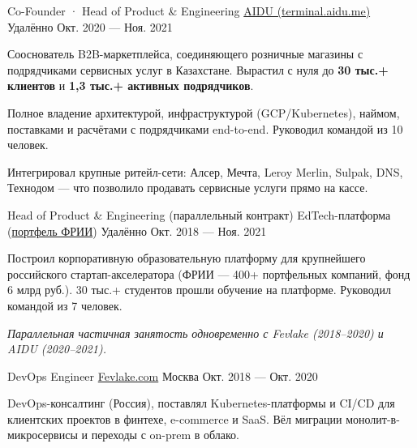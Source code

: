 \documentclass[10pt, a4paper]{awesome-cv}
\begin{document}
\begin{cventries}
  \cventry
    {Co-Founder · Head of Product \& Engineering}
    {\href{https://terminal.aidu.me/}{AIDU (terminal.aidu.me)}}
    {Удалённо}
    {Окт. 2020 — Ноя. 2021}
    {
      \begin{cvitems}
        \item {Сооснователь B2B-маркетплейса, соединяющего розничные магазины с подрядчиками сервисных услуг в Казахстане. Вырастил с нуля до \textbf{30 тыс.+ клиентов} и \textbf{1,3 тыс.+ активных подрядчиков}.}
        \item {Полное владение архитектурой, инфраструктурой (GCP/Kubernetes), наймом, поставками и расчётами с подрядчиками end-to-end. Руководил командой из 10 человек.}
        \item {Интегрировал крупные ритейл-сети: Алсер, Мечта, Leroy Merlin, Sulpak, DNS, Технодом --- что позволило продавать сервисные услуги прямо на кассе.}
      \end{cvitems}
    }

  \cventry
    {Head of Product \& Engineering (параллельный контракт)}
    {EdTech-платформа (\href{https://iidf.ru}{портфель ФРИИ})}
    {Удалённо}
    {Окт. 2018 — Ноя. 2021}
    {
      \begin{cvitems}
        \item {Построил корпоративную образовательную платформу для крупнейшего российского стартап-акселератора (ФРИИ --- 400+ портфельных компаний, фонд 6 млрд руб.). 30 тыс.+ студентов прошли обучение на платформе. Руководил командой из 7 человек.}
        \item {\textit{Параллельная частичная занятость одновременно с Fevlake (2018--2020) и AIDU (2020--2021).}}
      \end{cvitems}
    }

  \cventry
    {DevOps Engineer}
    {\href{https://fevlake.com}{Fevlake.com}}
    {Москва}
    {Окт. 2018 — Окт. 2020}
    {
      \begin{cvitems}
        \item {DevOps-консалтинг (Россия), поставлял Kubernetes-платформы и CI/CD для клиентских проектов в финтехе, e-commerce и SaaS. Вёл миграции монолит-в-микросервисы и переходы с on-prem в облако.}
      \end{cvitems}
    }

\end{cventries}
\end{document}
